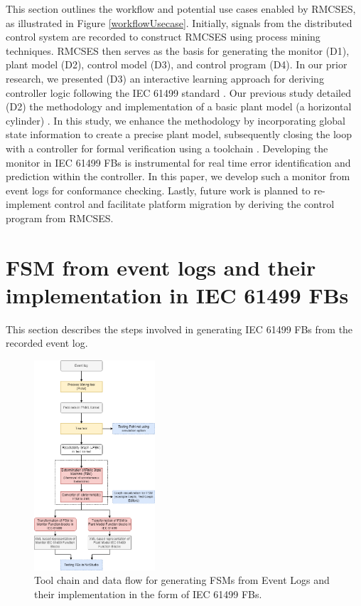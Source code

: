 \documentclass{ieeeojies}
\begin{document}
This section outlines the workflow and potential use cases enabled by RMCSES, as illustrated in Figure \ref{workflowUsecase}. Initially, signals from the distributed control system are recorded to construct RMCSES using process mining techniques. RMCSES then serves as the basis for generating the monitor (D1), plant model (D2), control model (D3), and control program (D4). In our prior research, we presented (D3) an interactive learning approach for deriving controller logic following the IEC 61499 standard \cite{xavier2022interactive}. Our previous study detailed (D2) the methodology and implementation of a basic plant model (a horizontal cylinder) \cite{xavier2022plant}. In this study, we enhance the methodology by incorporating global state information to create a precise plant model, subsequently closing the loop with a controller for formal verification using a toolchain \cite{xavier2021cyber}. Developing the monitor in IEC 61499 FBs is instrumental for real time error identification and prediction within the controller. In this paper, we develop such a monitor from event logs for conformance checking. Lastly, future work is planned to re-implement control and facilitate platform migration by deriving the control program from RMCSES.



\section{FSM from event logs and their implementation in IEC 61499 FBs}
\label{FSMfromEL}

This section describes the steps involved  in generating  IEC 61499 FBs from the recorded event log.

\begin{figure}[!t]
	\centering
	\includegraphics[width=0.4\textwidth]{images/Methodology.png}
	\caption{Tool chain and data flow for generating FSMs from Event Logs and their implementation in the form of IEC 61499 FBs.}
	\label{monitorFlowchart}
\end{figure}
    
\end{document}
